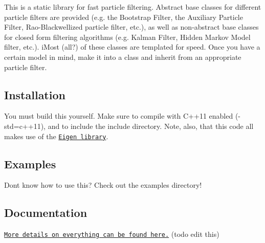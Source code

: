 This is a static library for fast particle filtering. Abstract base classes for different particle filters are provided (e.\+g. the Bootstrap Filter, the Auxiliary Particle Filter, Rao-\/\+Blackwellized particle filter, etc.), as well as non-\/abstract base classes for closed form filtering algorithms (e.\+g. Kalman Filter, Hidden Markov Model filter, etc.). i\+Most (all?) of these classes are templated for speed. Once you have a certain model in mind, make it into a class and inherit from an appropriate particle filter.

\subsection*{Installation}

You must build this yourself. Make sure to compile with C++11 enabled ({\ttfamily -\/std=c++11}), and to include the {\ttfamily include} directory. Note, also, that this code all makes use of the \href{http://eigen.tuxfamily.org/}{\tt Eigen library}.

\subsection*{Examples}

Don\textquotesingle{}t know how to use this? Check out the {\ttfamily examples} directory!

\subsection*{Documentation}

\href{https://tbrown122387.github.io/ssm/}{\tt More details on everything can be found here.} (todo edit this) 